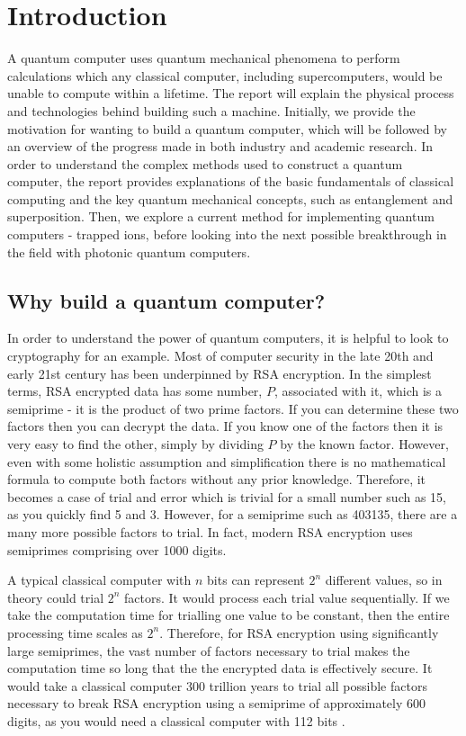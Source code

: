 \section{Introduction}
A quantum computer uses quantum mechanical phenomena to perform calculations which any classical computer, including supercomputers, would be unable to compute within a lifetime. \cite{noauthor_what_nodate}
The report will explain the physical process and technologies behind building such a machine. Initially, we provide the motivation for wanting to build a quantum computer, which will be followed by an overview of the progress made in both industry and academic research. In order to understand the complex methods used to construct a quantum computer, the report provides explanations of the basic fundamentals of classical computing and the key quantum mechanical concepts, such as entanglement and superposition. Then, we explore a current method for implementing quantum computers - trapped ions, before looking into the next possible breakthrough in the field with photonic quantum computers.

\subsection{Why build a quantum computer?}
In order to understand the power of quantum computers, it is helpful to look to cryptography for an example. Most of computer security in the late 20th and early 21st century has been underpinned by RSA encryption. In the simplest terms, RSA encrypted data has some number, $P$, associated with it, which is a semiprime - it is the product of two prime factors. If you can determine these two factors then you can decrypt the data. If you know one of the factors then it is very easy to find the other, simply by dividing $P$ by the known factor. However, even with some holistic assumption and simplification there is no mathematical formula to compute both factors without any prior knowledge. Therefore, it becomes a case of trial and error which is trivial for a small number such as 15, as you quickly find 5 and 3. However, for a semiprime such as 403135, there are a many more possible factors to trial. In fact, modern RSA encryption uses semiprimes comprising over 1000 digits.

A typical classical computer with $n$ bits can represent $2^n$ different values, so in theory could trial $2^n$ factors. It would process each trial value sequentially. If we take the computation time for trialling one value to be constant, then the entire processing time scales as $2^n$. Therefore, for RSA encryption using significantly large semiprimes, the vast number of factors necessary to trial makes the computation time so long that the the encrypted data is effectively secure. It would take a classical computer 300 trillion years to trial all possible factors necessary to break RSA encryption using a semiprime of approximately 600 digits, as you would need a classical computer with 112 bits \cite{mahto2016security}\cite{quintessencelabs_2022}.

